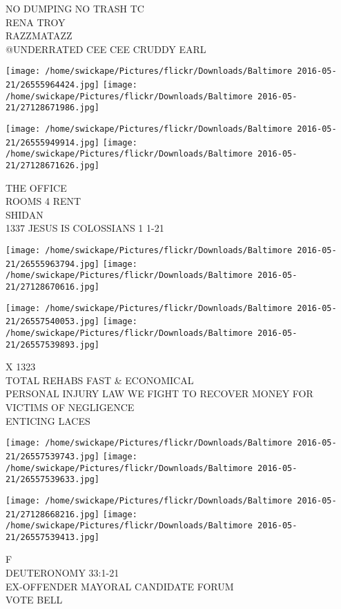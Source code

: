 \documentclass[10pt,letterpaper]{article}
\begin{document}
NO DUMPING NO TRASH TC\\
RENA TROY\\
RAZZMATAZZ\\
@UNDERRATED CEE CEE CRUDDY EARL
\pagebreak

\texttt{[image: /home/swickape/Pictures/flickr/Downloads/Baltimore 2016-05-21/26555964424.jpg]}
\texttt{[image: /home/swickape/Pictures/flickr/Downloads/Baltimore 2016-05-21/27128671986.jpg]}

\texttt{[image: /home/swickape/Pictures/flickr/Downloads/Baltimore 2016-05-21/26555949914.jpg]}
\texttt{[image: /home/swickape/Pictures/flickr/Downloads/Baltimore 2016-05-21/27128671626.jpg]}

THE OFFICE\\
ROOMS 4 RENT\\
SHIDAN\\
1337 JESUS IS COLOSSIANS 1 1{-}21
\pagebreak

\texttt{[image: /home/swickape/Pictures/flickr/Downloads/Baltimore 2016-05-21/26555963794.jpg]}
\texttt{[image: /home/swickape/Pictures/flickr/Downloads/Baltimore 2016-05-21/27128670616.jpg]}

\texttt{[image: /home/swickape/Pictures/flickr/Downloads/Baltimore 2016-05-21/26557540053.jpg]}
\texttt{[image: /home/swickape/Pictures/flickr/Downloads/Baltimore 2016-05-21/26557539893.jpg]}

X 1323\\
TOTAL REHABS FAST \& ECONOMICAL\\
PERSONAL INJURY LAW WE FIGHT TO RECOVER MONEY FOR VICTIMS OF NEGLIGENCE\\
ENTICING LACES
\pagebreak

\texttt{[image: /home/swickape/Pictures/flickr/Downloads/Baltimore 2016-05-21/26557539743.jpg]}
\texttt{[image: /home/swickape/Pictures/flickr/Downloads/Baltimore 2016-05-21/26557539633.jpg]}

\texttt{[image: /home/swickape/Pictures/flickr/Downloads/Baltimore 2016-05-21/27128668216.jpg]}
\texttt{[image: /home/swickape/Pictures/flickr/Downloads/Baltimore 2016-05-21/26557539413.jpg]}

F\\
DEUTERONOMY 33:1{-}21\\
EX{-}OFFENDER MAYORAL CANDIDATE FORUM\\
VOTE BELL
\pagebreak
\end{document}
